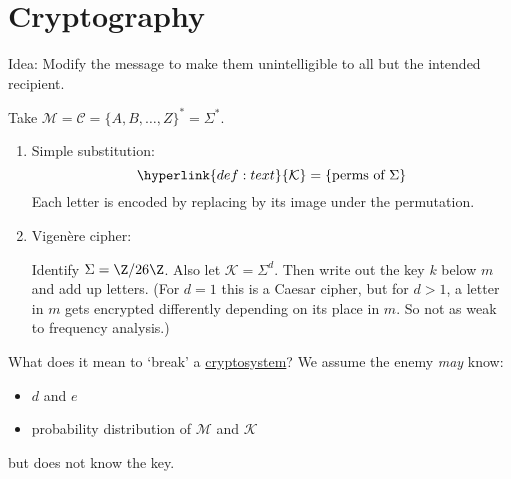 \documentclass{article}
\newcommand{\1}[1]{\mathbbm{1}_{#1}}
\begin{document}
\clearpage
\section{Cryptography}
Idea: Modify the message to make them unintelligible to all but the intended recipient.


\begin{eg}
    Take $\mathcal{M} = \mathcal{C} = \{A, B, \dotsc, Z\}^* = \Sigma^*$.
    \begin{enumerate}[label=(\roman*)]
        \item Simple substitution:
            \begin{equation*}
                \hyperlink{def:text}{\mathcal{K}} = \{\text{perms of } \Sigma\}
            \end{equation*}
            Each letter is encoded by replacing by its image under the permutation.
        \item Vigen\`{e}re cipher:

            Identify $\Sigma = \Z/26\Z$. Also let $\mathcal{K} = \Sigma^d$.
            Then write out the key $k$ below $m$ and add up letters.
            (For $d=1$ this is a Caesar cipher, but for $d > 1$, a letter in $m$ gets encrypted differently depending on its place in $m$. So not as weak to frequency analysis.)
    \end{enumerate}
\end{eg}
What does it mean to `break' a \hyperlink{def:cryptosystem}{cryptosystem}?
We assume the enemy \textit{may} know:
\begin{itemize}
    \item $d$ and $e$
    \item probability distribution of $\mathcal{M}$ and $\mathcal{K}$
\end{itemize}
but does not know the key.
\end{document}
